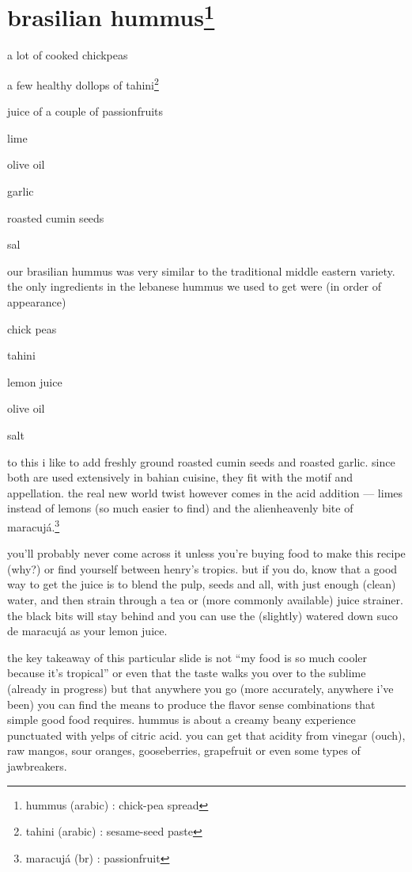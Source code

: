 \section{brasilian hummus\footnote{hummus (arabic) : chick-pea spread}}

\begin{ingredients}
  \item a lot of cooked chickpeas
  \item a few healthy dollops of tahini\footnote{tahini (arabic) : sesame-seed paste}
  \item juice of a couple of passionfruits
  \item lime
  \item olive oil
  \item garlic
  \item roasted cumin seeds
  \item sal
\end{ingredients}

our brasilian hummus was very similar to the traditional middle
eastern variety. the only ingredients in the lebanese hummus we used
to get were (in order of appearance)

\begin{ingredients}
  \item chick peas
  \item tahini
  \item lemon juice
  \item olive oil
  \item salt
\end{ingredients}

to this i like to add freshly ground roasted cumin seeds and roasted
garlic. since both are used extensively in bahian cuisine, they fit
with the motif and appellation. the real new world twist however comes
in the acid addition --- limes instead of lemons (so much easier to
find) and the alienheavenly bite of
maracuj\'{a}.\footnote{maracuj\'{a} (br) : passionfruit}

you'll probably never come across it unless you're buying food
to make this recipe (why?) or find yourself between henry's
tropics. but if you do, know that a good way to get the juice is to
blend the pulp, seeds and all, with just enough (clean) water, and
then strain through a tea or (more commonly available) juice
strainer. the black bits will stay behind and you can use the
(slightly) watered down suco de maracuj\'{a} as your lemon juice.

the key takeaway of this particular slide is not ``my food is so
much cooler because it's tropical'' or even that the taste walks
you over to the sublime (already in progress) but that anywhere you go
(more accurately, anywhere i've been) you can find the means to
produce the flavor sense combinations that simple good food
requires. hummus is about a creamy beany experience punctuated with
yelps of citric acid. you can get that acidity from vinegar (ouch),
raw mangos, sour oranges, gooseberries, grapefruit or even some types
of jawbreakers.

